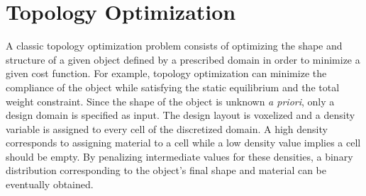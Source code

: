 \section{Topology Optimization}
\label{sec:topoOpt}
A classic topology optimization problem consists of optimizing the shape and structure of a given object defined by a prescribed domain in order to minimize a given cost function.
For example, topology optimization can minimize the compliance of the object while satisfying the static equilibrium and the total weight constraint.
Since the shape of the object is unknown {\it a priori}, only a design domain is specified as input.
The design layout is voxelized and a density variable is assigned to every cell of the discretized domain.
A high density corresponds to assigning material to a cell while a low density value implies a cell should be empty.
By penalizing intermediate values for these densities, a binary distribution corresponding to the object's final shape and material can be eventually obtained.

